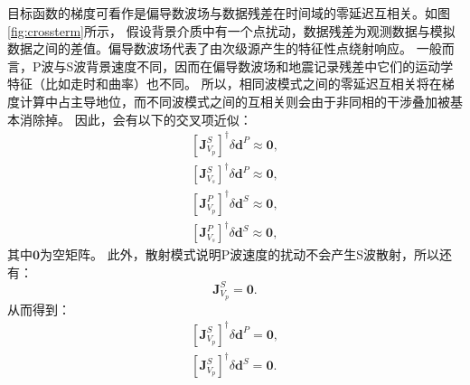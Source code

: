 目标函数的梯度可看作是偏导数波场与数据残差在时间域的零延迟互相关\cite[]{pratt1998gauss}。如图\ref{fig:crossterm}所示，
假设背景介质中有一个点扰动，数据残差为观测数据与模拟数据之间的差值。偏导数波场代表了由次级源产生的特征性点绕射响应。
一般而言，P波与S波背景速度不同，因而在偏导数波场和地震记录残差中它们的运动学特征（比如走时和曲率）也不同。
所以，相同波模式之间的零延迟互相关将在梯度计算中占主导地位，而不同波模式之间的互相关则会由于非同相的干涉叠加被基本消除掉。
因此，会有以下的交叉项近似：
\begin{equation}
        \begin{split}
                [\mathbf{J}_{V_p}^{S}]^{\dagger}\delta \mathbf{d}^P\approx\mathbf{0},\\
                [\mathbf{J}_{V_s}^{S}]^{\dagger}\delta \mathbf{d}^P\approx\mathbf{0},\\
                [\mathbf{J}_{V_p}^{P}]^{\dagger}\delta \mathbf{d}^S\approx\mathbf{0},\\
                [\mathbf{J}_{V_s}^{P}]^{\dagger}\delta \mathbf{d}^S\approx\mathbf{0},
        \end{split}
        \label{eq:crossterms}
\end{equation}
其中$\mathbf{0}$为空矩阵。
此外，散射模式说明P波速度的扰动不会产生S波散射，所以还有：
\begin{equation}
\mathbf{J}^S_{V_p}=\mathbf{0}.
\label{eq:Jsvp}
\end{equation}
从而得到：
\begin{equation}
        \begin{split}
[\mathbf{J}^S_{V_p}]^{\dagger}\delta \mathbf{d}^P=\mathbf{0}, \\
[\mathbf{J}^S_{V_p}]^{\dagger}\delta \mathbf{d}^S=\mathbf{0}.
        \end{split}
\label{eq:Jsvp1}
\end{equation}
